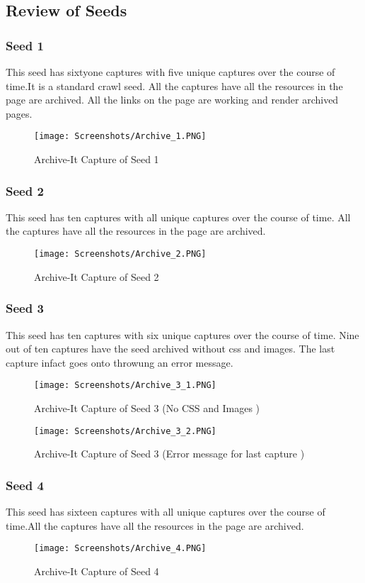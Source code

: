 \documentclass[11pt,journal,compsoc,onecolumn]{IEEEtran}
\begin{document}
\subsection{Review of  Seeds}
\subsubsection{Seed 1}
This seed has sixtyone captures with five unique captures over the course of time.It is a standard crawl seed. All the captures have all the resources in the page are archived. All the links on the page are working and render archived pages.
 \begin{figure}[ht] 
  \centering
  \texttt{[image: Screenshots/Archive\_1.PNG]}
  \caption{Archive-It Capture of Seed 1}
  \label{fig:22}
\end{figure}
\subsubsection{Seed 2}
This seed has ten captures with all unique captures over the course of time. All the captures have all the resources in the page are archived.
 \begin{figure}[ht] 
  \centering
  \texttt{[image: Screenshots/Archive\_2.PNG]}
  \caption{Archive-It Capture of Seed 2}
  \label{fig:23}
\end{figure}
\subsubsection{Seed 3}
This seed has ten captures with six unique captures over the course of time. Nine out of ten captures have the seed archived without css and images. The last capture infact goes onto throwung an error message.
 \begin{figure}[ht] 
  \centering
  \texttt{[image: Screenshots/Archive\_3\_1.PNG]}
  \caption{Archive-It Capture of Seed 3 (No CSS and Images )}
  \label{fig:24}
\end{figure}
 \begin{figure}[ht] 
  \centering
  \texttt{[image: Screenshots/Archive\_3\_2.PNG]}
  \caption{Archive-It Capture of Seed 3 (Error message for last capture )}
  \label{fig:25}
\end{figure}
\subsubsection{Seed 4}
This seed has sixteen captures with all unique captures over the course of time.All the captures have all the resources in the page are archived.
 \begin{figure}[ht] 
  \centering
  \texttt{[image: Screenshots/Archive\_4.PNG]}
  \caption{Archive-It Capture of Seed 4}
  \label{fig:26}
\end{figure}
\end{document}

